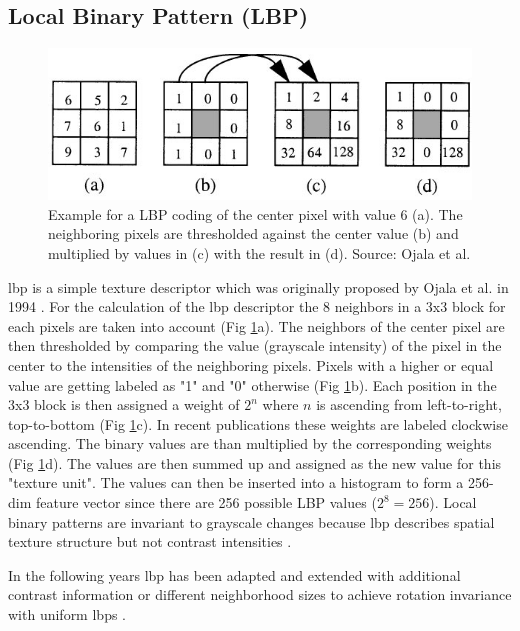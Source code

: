 \subsection[LBP]{Local Binary Pattern (LBP)}
\begin{figure}[ht]
	\centering
	\includegraphics[width=\linewidth]{figures/theoryLBP_coding}
	\caption{Example for a LBP coding of the center pixel with value 6 (a). The neighboring pixels are thresholded against the center value (b) and multiplied by values in (c) with the result in (d). Source: Ojala et al. \cite{Ojala1999}}
	\label{fig:lbpCoding}
\end{figure}
\acrfull{lbp} is a simple texture descriptor which was originally proposed by Ojala et al. in 1994 \cite{Ojala1994}. For the calculation of the \gls{lbp} descriptor the 8 neighbors in a 3x3 block for each pixels are taken into account {(Fig \ref{fig:lbpCoding}a)}. The neighbors of the center pixel are then thresholded by comparing the value {(grayscale intensity)} of the pixel in the center to the intensities of the neighboring pixels. Pixels with a higher or equal value are getting labeled as "1" and "0" otherwise {(Fig \ref{fig:lbpCoding}b)}. Each position in the 3x3 block is then assigned a weight of $2^n$ where $n$ is ascending from left-to-right, top-to-bottom {(Fig \ref{fig:lbpCoding}c)}. In recent publications these weights are labeled clockwise ascending. The binary values are than multiplied by the corresponding weights {(Fig \ref{fig:lbpCoding}d)}. The values are then summed up and assigned as the new value for this "texture unit". The values can then be inserted into a histogram to form a 256-dim feature vector since there are 256 possible LBP values {($2^8=256$)}. Local binary patterns are invariant to grayscale changes because \gls{lbp} describes spatial texture structure but not contrast intensities \cite{Ojala1999}.  

In the following years \gls{lbp} has been adapted and extended with additional contrast information \cite{Ojala1999} or different neighborhood sizes to achieve rotation invariance with uniform \glspl{lbp} \cite{Ojala2002}.


